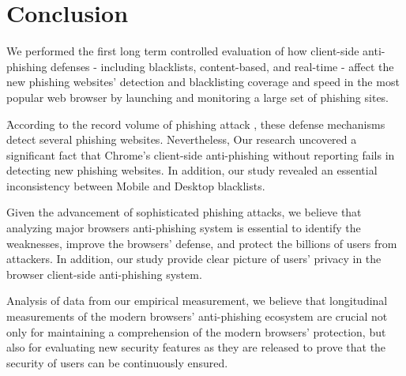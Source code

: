 \section{Conclusion}
\label{s:conclusion}

We performed the first long term controlled evaluation of how client-side anti-phishing defenses - including blacklists, content-based, and real-time - affect the new phishing websites' detection and blacklisting coverage and speed in the most popular web browser by launching and monitoring a large set of phishing sites. 

َAccording to the record volume of phishing attack \cite{APWG}, these defense mechanisms detect several phishing websites. Nevertheless, Our research uncovered a significant fact that Chrome's client-side anti-phishing without reporting fails in detecting new phishing websites. In addition, our study revealed an essential inconsistency between Mobile and Desktop blacklists. 

Given the advancement of sophisticated phishing attacks, we believe that analyzing major browsers anti-phishing system is essential to identify the weaknesses, improve the browsers' defense, and protect the billions of users from attackers. In addition, our study provide clear picture of users' privacy in the browser client-side anti-phishing system.

Analysis of data from our empirical measurement, we believe that longitudinal measurements of the modern browsers' anti-phishing ecosystem are crucial not only for maintaining a comprehension
of the modern browsers' protection, but also for
evaluating new security features as they are released to prove that the security of users can be continuously ensured.